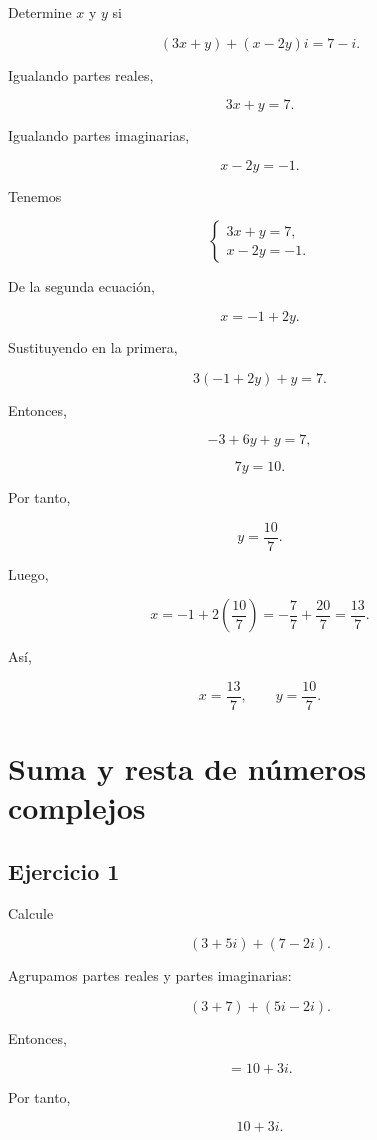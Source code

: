 \documentclass[12pt]{article}
\begin{document}
Determine \(x\) y \(y\) si

\[
(3x+y)+(x-2y)i=7-i.
\]

Igualando partes reales,

\[
3x+y=7.
\]

Igualando partes imaginarias,

\[
x-2y=-1.
\]

Tenemos

\[
\begin{cases}
3x+y=7,\\
x-2y=-1.
\end{cases}
\]

De la segunda ecuación,

\[
x=-1+2y.
\]

Sustituyendo en la primera,

\[
3(-1+2y)+y=7.
\]

Entonces,

\[
-3+6y+y=7,
\]

\[
7y=10.
\]

Por tanto,

\[
y=\frac{10}{7}.
\]

Luego,

\[
x=-1+2\left(\frac{10}{7}\right)
=
-\frac77+\frac{20}{7}
=
\frac{13}{7}.
\]

Así,

\[
\boxed{
x=\frac{13}{7},
\qquad
y=\frac{10}{7}
}.
\]

\section*{Suma y resta de números complejos}

\subsection*{Ejercicio 1}

Calcule

\[
(3+5i)+(7-2i).
\]

Agrupamos partes reales y partes imaginarias:

\[
(3+7)+(5i-2i).
\]

Entonces,

\[
=10+3i.
\]

Por tanto,

\[
\boxed{10+3i}.
\]

\end{document}
